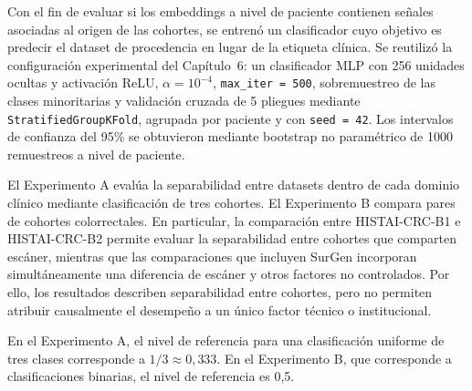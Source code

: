 Con el fin de evaluar si los embeddings a nivel de paciente contienen señales asociadas al origen de las cohortes, se entrenó un clasificador cuyo objetivo es predecir el dataset de procedencia en lugar de la etiqueta clínica. Se reutilizó la configuración experimental del Capítulo~6: un clasificador MLP con 256 unidades ocultas y activación ReLU, $\alpha = 10^{-4}$, \texttt{max\_iter = 500}, sobremuestreo de las clases minoritarias y validación cruzada de 5 pliegues mediante \texttt{StratifiedGroupKFold}, agrupada por paciente y con \texttt{seed = 42}. Los intervalos de confianza del 95\% se obtuvieron mediante bootstrap no paramétrico de 1000 remuestreos a nivel de paciente.

El Experimento A evalúa la separabilidad entre datasets dentro de cada dominio clínico mediante clasificación de tres cohortes. El Experimento B compara pares de cohortes colorrectales. En particular, la comparación entre HISTAI-CRC-B1 e HISTAI-CRC-B2 permite evaluar la separabilidad entre cohortes que comparten escáner, mientras que las comparaciones que incluyen SurGen incorporan simultáneamente una diferencia de escáner y otros factores no controlados. Por ello, los resultados describen separabilidad entre cohortes, pero no permiten atribuir causalmente el desempeño a un único factor técnico o institucional.

En el Experimento A, el nivel de referencia para una clasificación uniforme de tres clases corresponde a $1/3 \approx 0{,}333$. En el Experimento B, que corresponde a clasificaciones binarias, el nivel de referencia es 0,5.

